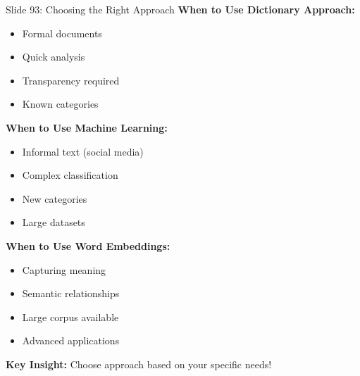 \documentclass[8pt]{beamer}
\begin{document}
	\begin{frame}{Slide 93: Choosing the Right Approach}
		\fontsize{6.5}{7.5}\selectfont
		\textbf{When to Use Dictionary Approach:}
		\begin{itemize}
			\item Formal documents
			\item Quick analysis
			\item Transparency required
			\item Known categories
		\end{itemize}
		
		\vspace{0.1cm}
		\textbf{When to Use Machine Learning:}
		\begin{itemize}
			\item Informal text (social media)
			\item Complex classification
			\item New categories
			\item Large datasets
		\end{itemize}
		
		\vspace{0.1cm}
		\textbf{When to Use Word Embeddings:}
		\begin{itemize}
			\item Capturing meaning
			\item Semantic relationships
			\item Large corpus available
			\item Advanced applications
		\end{itemize}
		
		\textcolor{myblue}{\textbf{Key Insight:}} Choose approach based on your specific needs!
	\end{frame}
	
\end{document}
